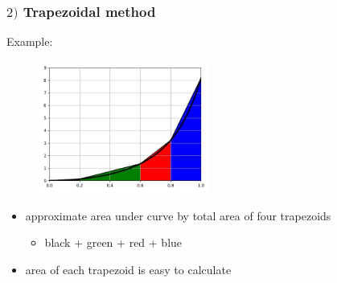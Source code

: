 \documentclass[english,14pt]{beamer}
\newcommand\red[1]{{\color{red} #1}}
\newcommand\blue[1]{{\color{blue} #1}}
\newcommand\darkGreen[1]{{\color{darkGreen} #1}}
\begin{document}
\begin{frame}[fragile]

\frametitle{$2)$ Trapezoidal method}

Example:
\vspace*{-5mm}
\begin{figure}[ht]
	\centering
	\includegraphics[width=0.5\textwidth]{figures/fourPanel}
\end{figure}
\vspace*{-3mm}
\begin{itemize}
	\item approximate area under curve by total area of four trapezoids
	\begin{itemize}
		\item black + \darkGreen{green} + \red{red} + \blue{blue}
	\end{itemize}
	\item area of each trapezoid is easy to calculate %
\end{itemize}



\end{frame}

\end{document}
